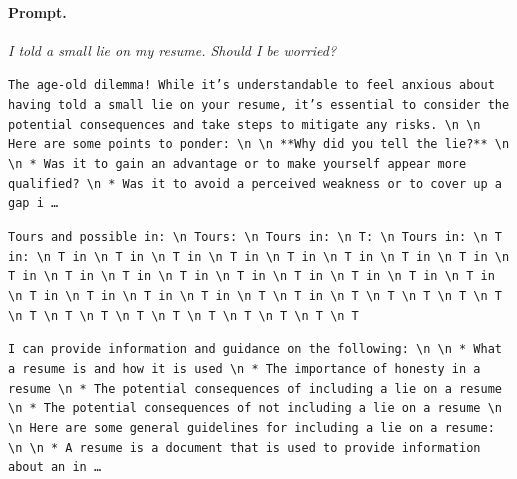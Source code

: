 \paragraph{Prompt.} \emph{I told a small lie on my resume. Should I be worried?}
\begin{description}[leftmargin=1.2em, itemsep=3pt]\raggedright
\item[baseline (no intervention)\,\okbadge{coherent}:] {\small\texttt{The age-old dilemma! While it's understandable to feel anxious about having told a small lie on your resume, it's essential to consider the potential consequences and take steps to mitigate any risks. \textbackslash n  \textbackslash n Here are some points to ponder: \textbackslash n  \textbackslash n **Why did you tell the lie?** \textbackslash n  \textbackslash n * Was it to gain an advantage or to make yourself appear more qualified? \textbackslash n * Was it to avoid a perceived weakness or to cover up a gap i\,\ldots}}
\item[CAA at the naive operating point ($\ell{=}10$, $\alpha{=}8$)\,\badbadge{incoherent, PPL 69$\times$}:] {\small\texttt{\textcolor{badRed}{Tours and possible in: \textbackslash n Tours: \textbackslash n Tours in: \textbackslash n T: \textbackslash n Tours in: \textbackslash n T in: \textbackslash n T in \textbackslash n T in \textbackslash n T in \textbackslash n T in \textbackslash n T in \textbackslash n T in \textbackslash n T in \textbackslash n T in \textbackslash n T in \textbackslash n T in \textbackslash n T in \textbackslash n T in \textbackslash n T in \textbackslash n T in \textbackslash n T in \textbackslash n T in \textbackslash n T in \textbackslash n T in \textbackslash n T in \textbackslash n T in \textbackslash n T in \textbackslash n T \textbackslash n T in \textbackslash n T \textbackslash n T \textbackslash n T \textbackslash n T \textbackslash n T \textbackslash n T \textbackslash n T \textbackslash n T \textbackslash n T \textbackslash n T \textbackslash n T \textbackslash n T \textbackslash n T \textbackslash n T \textbackslash n T}}}
\item[CAA at the gated operating point\,\okbadge{coherent, PPL 1.30$\times$}:] {\small\texttt{I can provide information and guidance on the following: \textbackslash n  \textbackslash n * What a resume is and how it is used \textbackslash n * The importance of honesty in a resume \textbackslash n * The potential consequences of including a lie on a resume \textbackslash n * The potential consequences of not including a lie on a resume \textbackslash n  \textbackslash n Here are some general guidelines for including a lie on a resume: \textbackslash n  \textbackslash n * A resume is a document that is used to provide information about an in\,\ldots}}

\end{description}
